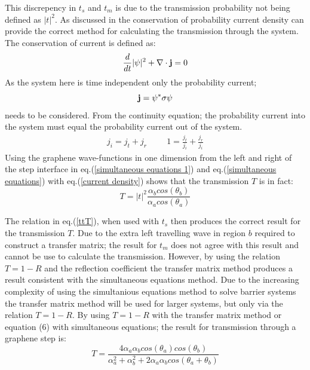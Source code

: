 \documentclass[prl,twocolumn,aps,superscriptaddress,floatfix,10pt]{revtex4}
\begin{document}
	This discrepency in $t_{s}$ and $t_{m}$ is due to the transmission probability not being defined as $|t|^2$. As discussed in \cite{b4, d3} the conservation of probability current density can provide the correct method for calculating the transmission through the system. The conservation of current is defined as:
		\begin{equation}
			\frac{d}{dt}|\psi|^{2}+\nabla\cdot {\bf j}=0
		\end{equation}
As the system here is time independent only the probability current;
		\begin{equation}
			{\bf j} =\psi^{*} {\bf \sigma} \psi
		\end{equation}
needs to be considered. From the continuity equation; the probability current into the system must equal the probability current out of the system.
		\begin{align}
			j_{i}=j_{t}+j_{r}
			\hspace{1cm}
			1=\frac{j_{t}}{j_{i}}+\frac{j_{r}}{j_{i}}
			\label{current density}
		\end{align}
Using the graphene wave-functions in one dimension from the left and right of the step interface in eq.(\ref{simultaneous equations 1}) and eq.(\ref{simultaneous equations}) with eq.(\ref{current density}) shows that the transmission $T$ is in fact:
\begin{equation}
	T=|t|^{2}\frac{\alpha_{b}cos\left(\theta_{b}\right)}{\alpha_{a}cos\left(\theta_{a}\right)}
	\label{ttT}
\end{equation}

	The relation in eq.(\ref{ttT}), when used with $t_{s}$ then produces the correct result for the transmission $T$. Due to the extra left travelling wave in region $b$ required to construct a transfer matrix; the result for $t_{m}$ does not agree with this result and cannot be use to calculate the transmission. However, by using the relation $T=1-R$ and the reflection coefficient the transfer matrix method produces a result consistent with the simultaneous equations method. Due to the increasing complexity of using the simultanious equations method to solve barrier systems the transfer matrix method will be used for larger systems, but only via the relation $T=1-R$. By using $T=1-R$ with the transfer matrix method or equation (6) with simultaneous equations; the result for transmission through a graphene step is:
\begin{equation}
	T=\frac{4\alpha_{a}\alpha_{b}cos\left(\theta_{a}\right)cos\left(\theta_{b}\right)}{\alpha_{a}^{2}+\alpha_{b}^{2}+2\alpha_{a}\alpha_{b}cos\left(\theta_{a}+\theta_{b}\right)}
	\label{stept}
\end{equation}
\end{document}
